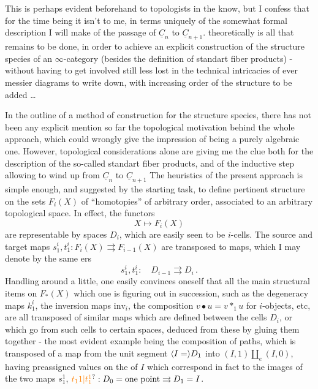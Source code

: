  This is perhaps evident beforehand to topologists in the know, but I confess that for the time being it isn't to me, in terms uniquely of the somewhat formal description I will make of the passage of $\underline{C}_n$ to $\underline{C}_{n+1}$.  theoretically is all that remains to be done, in order to achieve an explicit construction of the  structure species of an \deleted{\unsure{$\infty$}}$\infty$-category (besides the definition of standart fiber products) - without having to get involved still less lost in the technical intricacies of ever messier diagrams to\deleted{\unsure{,}} write down, with increasing order of the structure to be added \ldots

\quad In the outline of a method of construction for the structure species, there has not been any explicit mention so far  the topological motivation behind the whole approach, which could wrongly give the impression of being a purely algebraic one. However, topological considerations alone are giving me the clue both for the description of the so-called standart fiber products, and of the inductive step allowing to wind up from $\underline{C}_n$ to $\underline{C}_{n+1}$  The heuristics  of the present approach is simple enough, and suggested by the starting task, to define pertinent structure on the  sets $F_i(X)$ of ``homotopies'' of arbitrary order, associated to an arbitrary topological space. In effect, the functors 
\[
X\longmapsto F_i(X)
\]
are representable by spaces $D_i$, which are easily seen to be $i$-cells. The source and target maps $s^i_1,t^i_1:F_i(X)\rightrightarrows F_{i-1}(X)$ are transposed to maps, which I may denote by the same ers
\[
s^i_1,t^i_1:\quad D_{i-1}\rightrightarrows D_i\,.
\]
Handling around a little, one easily convinces oneself that all the main structural items on $F_*(X)$ which one is figuring out in succession, such as the degeneracy maps $k_1^i$, the inversion maps $\mathrm{inv}_i$, the composition $v\bullet u=v*_1u$ for $i$-objects, etc, are all transposed of similar maps which are defined between the cells $D_i$, or which go from such cells to certain spaces, deduced from these by gluing them together - the most evident example  being the composition of paths, which is transposed of a map from the unit segment $\inserted{I=}D_1$ into $(I,1)\amalg_e(I,0)$, having preassigned values on the  of $I$ \handwritten{(}which correspond in fact to the images of the two maps $s_1^1$, $\unsure{t_1 1|t_1^1}:D_0={}\text{one point}\rightrightarrows D_1=I$\handwritten{)}.

